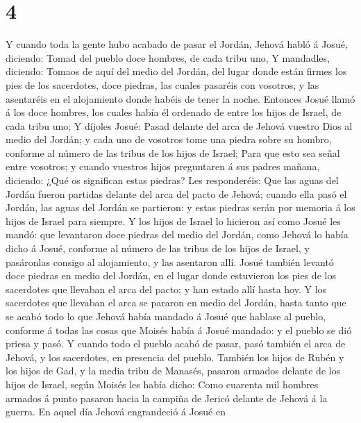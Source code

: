 \hypertarget{section-3}{%
\section{4}\label{section-3}}

 Y cuando toda la gente hubo acabado de pasar el Jordán,
Jehová habló á Josué, diciendo:  Tomad del pueblo doce
hombres, de cada tribu uno,  Y mandadles, diciendo: Tomaos
de aquí del medio del Jordán, del lugar donde están firmes los pies de
los sacerdotes, doce piedras, las cuales pasaréis con vosotros, y las
asentaréis en el alojamiento donde habéis de tener la noche.
 Entonces Josué llamó á los doce hombres, los cuales había
él ordenado de entre los hijos de Israel, de cada tribu uno;
 Y díjoles Josué: Pasad delante del arca de Jehová vuestro
Dios al medio del Jordán; y cada uno de vosotros tome una piedra sobre
su hombro, conforme al número de las tribus de los hijos de Israel;
 Para que esto sea señal entre vosotros; y cuando vuestros
hijos preguntaren á sus padres mañana, diciendo: ¿Qué os significan
estas piedras?  Les responderéis: Que las aguas del Jordán
fueron partidas delante del arca del pacto de Jehová; cuando ella pasó
el Jordán, las aguas del Jordán se partieron: y estas piedras serán por
memoria á los hijos de Israel para siempre.  Y los hijos
de Israel lo hicieron así como Josué les mandó: que levantaron doce
piedras del medio del Jordán, como Jehová lo había dicho á Josué,
conforme al número de las tribus de los hijos de Israel, y pasáronlas
consigo al alojamiento, y las asentaron allí.  Josué
también levantó doce piedras en medio del Jordán, en el lugar donde
estuvieron los pies de los sacerdotes que llevaban el arca del pacto; y
han estado allí hasta hoy.  Y los sacerdotes que llevaban
el arca se pararon en medio del Jordán, hasta tanto que se acabó todo lo
que Jehová había mandado á Josué que hablase al pueblo, conforme á todas
las cosas que Moisés había á Josué mandado: y el pueblo se dió priesa y
pasó.  Y cuando todo el pueblo acabó de pasar, pasó
también el arca de Jehová, y los sacerdotes, en presencia del pueblo.
 También los hijos de Rubén y los hijos de Gad, y la
media tribu de Manasés, pasaron armados delante de los hijos de Israel,
según Moisés les había dicho:  Como cuarenta mil hombres
armados á punto pasaron hacia la campiña de Jericó delante de Jehová á
la guerra.  En aquel día Jehová engrandeció á Josué en
